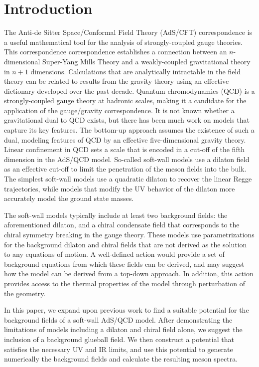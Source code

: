 \section{Introduction}

The Anti-de Sitter Space/Conformal Field Theory (AdS/CFT) correspondence is a useful mathematical tool for the analysis of strongly-coupled gauge theories.
This correspondence correspondence establishes a connection between an $n$-dimensional Super-Yang Mills Theory and a weakly-coupled gravitational theory in $n+1$ dimensions. 
Calculations that are analytically intractable in the field theory can be related to results from the gravity theory using an effective dictionary developed over the past decade. 
Quantum chromodynamics (QCD) is a strongly-coupled gauge theory at hadronic scales, making it a candidate for the application of the gauge/gravity correspondence.
It is not known whether a gravitational dual to QCD exists, but there has been much work on models that capture its key features.
The bottom-up approach assumes the existence of such a dual, modeling features of QCD by an effective five-dimensional gravity theory.
Linear confinement in QCD sets a scale that is encoded in a cut-off of the fifth dimension in the AdS/QCD model. 
So-called soft-wall models use a dilaton field as an effective cut-off to limit the penetration of the meson fields into the bulk. 
The simplest soft-wall models use a quadratic dilaton to recover the linear Regge trajectories, while models that modify the UV behavior of the dilaton more accurately model the ground state masses.

The soft-wall models typically include at least two background fields: the aforementioned dilaton, and a chiral condensate field that corresponds to the chiral symmetry breaking in the gauge theory.
These models use parametrizations for the background dilaton and chiral fields that are not derived as the solution to any equations of motion. 
A well-defined action would provide a set of background equations from which these fields can be derived, and may suggest how the model can be derived from a top-down approach. 
In addition, this action provides access to the thermal properties of the model through perturbation of the geometry.

In this paper, we expand upon previous work to find a suitable potential for the background fields of a soft-wall AdS/QCD model. 
After demonstrating the limitations of models including a dilaton and chiral field alone, we suggest the inclusion of a background glueball field. 
We then construct a potential that satisfies the necessary UV and IR limits, and use this potential to generate numerically the background fields and calculate the resulting meson spectra.

